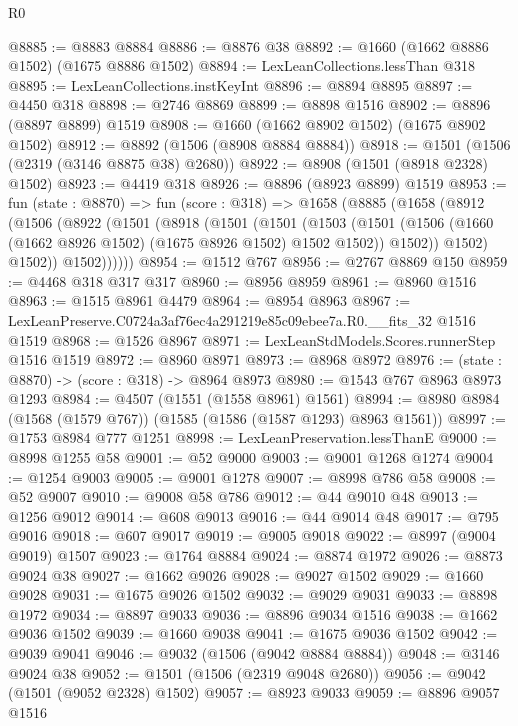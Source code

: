\begin{lexlean}{R0}
\begin{coremodule}
@8885 := @8883 @8884
@8886 := @8876 @38
@8892 := @1660 (@1662 @8886 @1502) (@1675 @8886 @1502)
@8894 := LexLeanCollections.lessThan @318
@8895 := LexLeanCollections.instKeyInt
@8896 := @8894 @8895
@8897 := @4450 @318
@8898 := @2746 @8869
@8899 := @8898 @1516
@8902 := @8896 (@8897 @8899) @1519
@8908 := @1660 (@1662 @8902 @1502) (@1675 @8902 @1502)
@8912 := @8892 (@1506 (@8908 @8884 @8884))
@8918 := @1501 (@1506 (@2319 (@3146 @8875 @38) @2680))
@8922 := @8908 (@1501 (@8918 @2328) @1502)
@8923 := @4419 @318
@8926 := @8896 (@8923 @8899) @1519
@8953 := fun (state : @8870) =>
  fun (score : @318) =>
  @1658
    (@8885
      (@1658
        (@8912
          (@1506
            (@8922
              (@1501
                (@8918
                  (@1501
                    (@1501
                      (@1503
                        (@1501
                          (@1506 (@1660 (@1662 @8926 @1502) (@1675 @8926 @1502) @1502 @1502))
                          @1502))
                      @1502)
                    @1502))
                @1502))))))
@8954 := @1512 @767
@8956 := @2767 @8869 @150
@8959 := @4468 @318 @317 @317
@8960 := @8956 @8959
@8961 := @8960 @1516
@8963 := @1515 @8961 @4479
@8964 := @8954 @8963
@8967 := LexLeanPreserve.C0724a3af76ec4a291219e85c09ebee7a.R0.__fits_32 @1516 @1519
@8968 := @1526 @8967
@8971 := LexLeanStdModels.Scores.runnerStep @1516 @1519
@8972 := @8960 @8971
@8973 := @8968 @8972
@8976 := (state : @8870) -> (score : @318) -> @8964 @8973
@8980 := @1543 @767 @8963 @8973 @1293
@8984 := @4507 (@1551 (@1558 @8961) @1561)
@8994 := @8980 @8984 (@1568 (@1579 @767)) (@1585 (@1586 (@1587 @1293) @8963 @1561))
@8997 := @1753 @8984 @777 @1251
@8998 := LexLeanPreservation.lessThanE
@9000 := @8998 @1255 @58
@9001 := @52 @9000
@9003 := @9001 @1268 @1274
@9004 := @1254 @9003
@9005 := @9001 @1278
@9007 := @8998 @786 @58
@9008 := @52 @9007
@9010 := @9008 @58 @786
@9012 := @44 @9010 @48
@9013 := @1256 @9012
@9014 := @608 @9013
@9016 := @44 @9014 @48
@9017 := @795 @9016
@9018 := @607 @9017
@9019 := @9005 @9018
@9022 := @8997 (@9004 @9019) @1507
@9023 := @1764 @8884
@9024 := @8874 @1972
@9026 := @8873 @9024 @38
@9027 := @1662 @9026
@9028 := @9027 @1502
@9029 := @1660 @9028
@9031 := @1675 @9026 @1502
@9032 := @9029 @9031
@9033 := @8898 @1972
@9034 := @8897 @9033
@9036 := @8896 @9034 @1516
@9038 := @1662 @9036 @1502
@9039 := @1660 @9038
@9041 := @1675 @9036 @1502
@9042 := @9039 @9041
@9046 := @9032 (@1506 (@9042 @8884 @8884))
@9048 := @3146 @9024 @38
@9052 := @1501 (@1506 (@2319 @9048 @2680))
@9056 := @9042 (@1501 (@9052 @2328) @1502)
@9057 := @8923 @9033
@9059 := @8896 @9057 @1516

\end{coremodule}
\end{lexlean}
